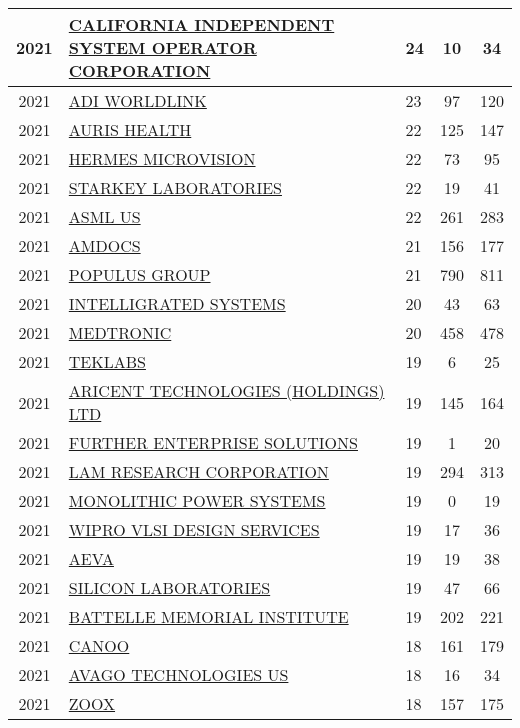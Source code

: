 \documentclass{article}%
\begin{document}
\begin{longtable}{c|p{20em}|p{5em}|c|c}
\hline%
2021&\hyperref[subsec:CALIFORNIAINDEPENDENTSYSTEMOPERATORCORPORATION]{CALIFORNIA INDEPENDENT SYSTEM OPERATOR CORPORATION}&24&10&34\\%
\hline%
2021&\hyperref[subsec:ADIWORLDLINK]{ADI WORLDLINK}&23&97&120\\%
\hline%
2021&\hyperref[subsec:AURISHEALTH]{AURIS HEALTH}&22&125&147\\%
\hline%
2021&\hyperref[subsec:HERMESMICROVISION]{HERMES MICROVISION}&22&73&95\\%
\hline%
2021&\hyperref[subsec:STARKEYLABORATORIES]{STARKEY LABORATORIES}&22&19&41\\%
\hline%
2021&\hyperref[subsec:ASMLUS]{ASML US}&22&261&283\\%
\hline%
2021&\hyperref[subsec:AMDOCS]{AMDOCS}&21&156&177\\%
\hline%
2021&\hyperref[subsec:POPULUSGROUP]{POPULUS GROUP}&21&790&811\\%
\hline%
2021&\hyperref[subsec:INTELLIGRATEDSYSTEMS]{INTELLIGRATED SYSTEMS}&20&43&63\\%
\hline%
2021&\hyperref[subsec:MEDTRONIC]{MEDTRONIC}&20&458&478\\%
\hline%
2021&\hyperref[subsec:TEKLABS]{TEKLABS}&19&6&25\\%
\hline%
2021&\hyperref[subsec:ARICENTTECHNOLOGIES(HOLDINGS)LTD]{ARICENT TECHNOLOGIES (HOLDINGS) LTD}&19&145&164\\%
\hline%
2021&\hyperref[subsec:FURTHERENTERPRISESOLUTIONS]{FURTHER ENTERPRISE SOLUTIONS}&19&1&20\\%
\hline%
2021&\hyperref[subsec:LAMRESEARCHCORPORATION]{LAM RESEARCH CORPORATION}&19&294&313\\%
\hline%
2021&\hyperref[subsec:MONOLITHICPOWERSYSTEMS]{MONOLITHIC POWER SYSTEMS}&19&0&19\\%
\hline%
2021&\hyperref[subsec:WIPROVLSIDESIGNSERVICES]{WIPRO VLSI DESIGN SERVICES}&19&17&36\\%
\hline%
2021&\hyperref[subsec:AEVA]{AEVA}&19&19&38\\%
\hline%
2021&\hyperref[subsec:SILICONLABORATORIES]{SILICON LABORATORIES}&19&47&66\\%
\hline%
2021&\hyperref[subsec:BATTELLEMEMORIALINSTITUTE]{BATTELLE MEMORIAL INSTITUTE}&19&202&221\\%
\hline%
2021&\hyperref[subsec:CANOO]{CANOO}&18&161&179\\%
\hline%
2021&\hyperref[subsec:AVAGOTECHNOLOGIESUS]{AVAGO TECHNOLOGIES US}&18&16&34\\%
\hline%
2021&\hyperref[subsec:ZOOX]{ZOOX}&18&157&175\\%

\end{longtable}
\end{document}
